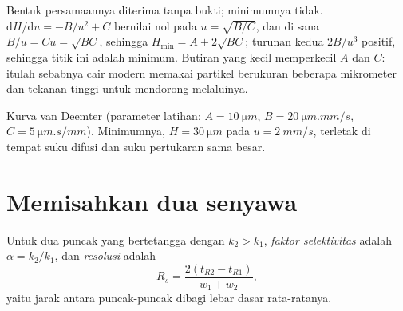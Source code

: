 \admitted

Bentuk persamaannya diterima tanpa bukti; minimumnya tidak. $\mathrm dH/\mathrm du = -B/u^2 + C$
bernilai nol pada $u = \sqrt{B/C}$, dan di sana $B/u = Cu = \sqrt{BC}$, sehingga $H_{\min} = A + 2\sqrt{BC}$;
turunan kedua $2B/u^3$ positif, sehingga titik ini adalah minimum. Butiran
yang kecil memperkecil $A$ dan $C$: itulah sebabnya  cair modern
memakai partikel berukuran beberapa mikrometer dan tekanan tinggi untuk
mendorong  melaluinya.

\begin{omfigure}

{\small Kurva van Deemter (parameter latihan: $A = \qty{10}{\micro m}$, $B = \qty{20}{\micro m.mm/s}$,
$C = \qty{5}{\micro m.s/mm}$). Minimumnya, $H = \qty{30}{\micro m}$ pada $u = \qty{2}{mm/s}$,
terletak di tempat suku difusi dan suku pertukaran sama besar.}
\end{omfigure}

\section{Memisahkan dua senyawa}

\begin{definition}\label{def:b2:chromatography:separation}
Untuk dua puncak yang bertetangga dengan $k_2 > k_1$, \emph{faktor
selektivitas} adalah
$\alpha = k_2/k_1$, dan \emph{resolusi} adalah
\begin{equation*}
R_s = \frac{2(t_{R2} - t_{R1})}{w_1 + w_2},
\end{equation*}
yaitu jarak antara puncak-puncak dibagi lebar dasar rata-ratanya.
\end{definition}

